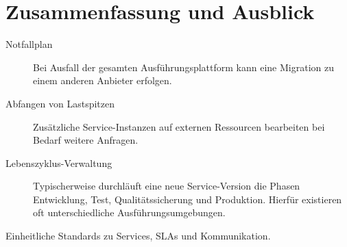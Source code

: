 %
%

\chapter{Zusammenfassung und Ausblick}



\begin{description}
	
	\item[Notfallplan] Bei Ausfall der gesamten Ausführungsplattform kann eine Migration zu einem anderen Anbieter erfolgen.
	
	\item[Abfangen von Lastspitzen] Zusätzliche Service-Instanzen auf externen Ressourcen bearbeiten bei Bedarf weitere Anfragen.
	
	\item[Lebenszyklus-Verwaltung] Typischerweise durchläuft eine neue Service-Version die Phasen Entwicklung, Test, Qualitätssicherung und Produktion. Hierfür existieren oft unterschiedliche Ausführungsumgebungen.
	
\end{description}


Einheitliche Standards zu Services, SLAs und Kommunikation.


